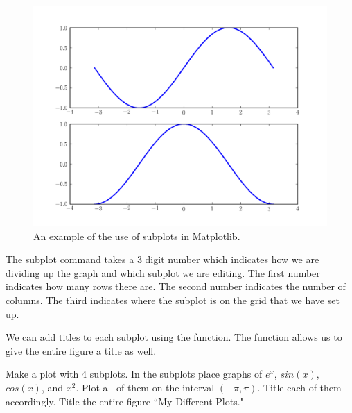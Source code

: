 \begin{figure}
\includegraphics[width=\textwidth]{subplots.pdf}
\caption{An example of the use of subplots in Matplotlib.}
\label{mpl:subplots}
\end{figure}

The subplot command takes a 3 digit number which indicates how we are dividing up the graph and which subplot we are editing.
The first number indicates how many rows there are.
The second number indicates the number of columns.
The third indicates where the subplot is on the grid that we have set up. 

We can add titles to each subplot using the  function.
The  function allows us to give the entire figure a title as well.

\begin{problem}
Make a plot with 4 subplots.
In the subplots place graphs of $e^x$, $sin(x)$, $cos(x)$, and $x^2$.
Plot all of them on the interval $(-\pi,\pi)$.
Title each of them accordingly.
Title the entire figure ``My Different Plots."
\end{problem}